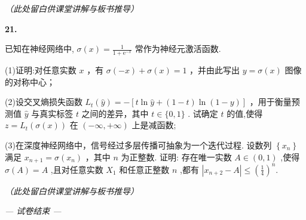 \documentclass[10pt]{article}
\newcommand{\largeboardspace}{%
  \par\vspace{8cm}
  \hfill\textit{（此处留白供课堂讲解与板书推导）}
  \par\vspace{1cm}
}
\newenvironment{questionblock}[1]{%
  \needspace{3\baselineskip}%
  \noindent\textbf{#1.}%
}{%
  \par\vspace{1em}%
}
\begin{document}
\largeboardspace

\newpage

\begin{questionblock}{21}
已知在神经网络中, \(\sigma \left( x\right)  = \frac{1}{1 + {\mathrm{e}}^{-x}}\) 常作为神经元激活函数.

(1)证明:对任意实数 \(x\) ，有 \(\sigma \left( {-x}\right)  + \sigma \left( x\right)  = 1\) ，并由此写出 \(y = \sigma \left( x\right)\) 图像的对称中心；

(2)设交叉熵损失函数 \({L}_{t}\left( \widehat{y}\right)  =  - \left\lbrack  {t\ln \widehat{y} + \left( {1 - t}\right) \ln \left( {1 - y}\right) }\right\rbrack\) ，用于衡量预测值 \(\widehat{y}\) 与真实标签 \(t\) 之间的差异，其中 \(t \in  \{ 0,1\}\) . 试确定 \(t\) 的值,使得 \(z = {L}_{t}\left( {\sigma \left( x\right) }\right)\) 在 \(\left( {-\infty , + \infty }\right)\) 上是减函数;

(3)在深度神经网络中，信号经过多层传播可抽象为一个迭代过程. 设数列 \(\left\{  {x}_{n}\right\}\) 满足 \({x}_{n + 1} = \sigma \left( {x}_{n}\right)\) ，其中 \(n\) 为正整数. 证明: 存在唯一实数 \(A \in  \left( {0,1}\right)\) ,使得 \(\sigma \left( A\right)  = A\) ,且对任意实数 \({X}_{1}\) 和任意正整数 \(n\) ,都有 \(\left| {{x}_{n + 2} - A}\right|  \leq  {\left( \frac{1}{4}\right) }^{n}.\)
\end{questionblock}

\largeboardspace

\vfill
\begin{center}
\textit{— 试卷结束 —}
\end{center}
\end{document}
